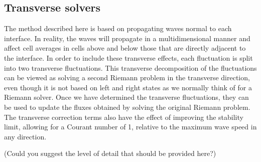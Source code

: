 \documentclass{article}
\begin{document}
\subsection{Transverse solvers}
The method described here is based on propagating waves normal to each interface.  In reality, the 
waves will propagate in a multidimensional manner and affect cell averages in cells above and below 
those that are directly adjacent to the interface.  In order to include these transverse effects, each 
fluctuation is split into two transverse fluctuations.  This transverse decomposition of the fluctuations can 
be viewed as solving a second Riemann problem in the transverse direction, even though it is not based 
on left and right states as we normally think of for a Riemann solver.  Once we have determined the 
transverse fluctuations, they can be used to update the fluxes obtained by solving the original Riemann 
problem.  The transverse correction terms also have the effect of improving the stability limit, allowing for 
a Courant number of 1, relative to the maximum wave speed in any direction. 

(Could you suggest the level of detail that should be provided here?)
\end{document}
